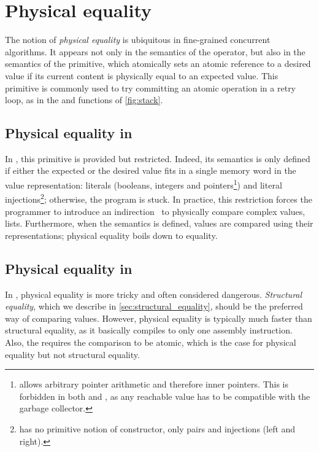 \section{Physical equality}
\label{sec:physical_equality}

The notion of \emph{physical equality} is ubiquitous in fine-grained concurrent algorithms.
It appears not only in the semantics of the \ocamlinline{==} operator, but also in the semantics of the  primitive, which atomically sets an atomic reference to a desired value if its current content is physically equal to an expected value.
This primitive is commonly used to try committing an atomic operation in a retry loop, as in the  and  functions of \cref{fig:stack}.

\subsection{Physical equality in \HeapLang}

In \HeapLang, this primitive is provided but restricted.
Indeed, its semantics is only defined if either the expected or the desired value fits in a single memory word in the \HeapLang value representation: literals (booleans, integers and pointers\footnote{\HeapLang allows arbitrary pointer arithmetic and therefore inner pointers. This is forbidden in both \OCaml and \ZooLang, as any reachable value has to be compatible with the garbage collector.}) and literal injections\footnote{\HeapLang has no primitive notion of constructor, only pairs and injections (left and right).}; otherwise, the program is stuck.
In practice, this restriction forces the programmer to introduce an indirection~\cite{iris/examples,DBLP:journals/pacmpl/JungLPRTDJ20,DBLP:conf/cpp/VindumB21} to physically compare complex values, \eg lists.
Furthermore, when the semantics is defined, values are compared using their \Rocq representations; physical equality boils down to \Rocq equality.

\subsection{Physical equality in \OCaml}

In \OCaml, physical equality is more tricky and often considered dangerous.
\emph{Structural equality}, which we describe in \cref{sec:structural_equality}, should be the preferred way of comparing values.
However, physical equality is typically much faster than structural equality, as it basically compiles to only one assembly instruction.
Also, the  requires the comparison to be atomic, which is the case for physical equality but not structural equality.

